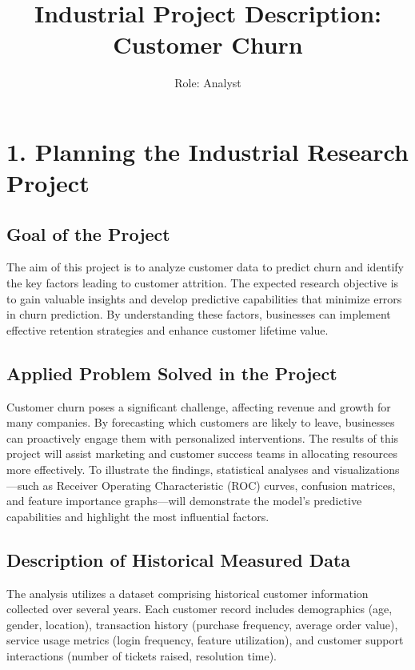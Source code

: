 \documentclass[12pt]{article}
\begin{document}
\title{Industrial Project Description: Customer Churn}
\author{Role: Analyst}
\date{}
\maketitle

\section*{1. Planning the Industrial Research Project}

\subsection*{Goal of the Project}

The aim of this project is to analyze customer data to predict churn and identify the key factors leading to customer attrition. The expected research objective is to gain valuable insights and develop predictive capabilities that minimize errors in churn prediction. By understanding these factors, businesses can implement effective retention strategies and enhance customer lifetime value.

\subsection*{Applied Problem Solved in the Project}

Customer churn poses a significant challenge, affecting revenue and growth for many companies. By forecasting which customers are likely to leave, businesses can proactively engage them with personalized interventions. The results of this project will assist marketing and customer success teams in allocating resources more effectively. To illustrate the findings, statistical analyses and visualizations---such as Receiver Operating Characteristic (ROC) curves, confusion matrices, and feature importance graphs---will demonstrate the model's predictive capabilities and highlight the most influential factors.

\subsection*{Description of Historical Measured Data}

The analysis utilizes a dataset comprising historical customer information collected over several years. Each customer record includes demographics (age, gender, location), transaction history (purchase frequency, average order value), service usage metrics (login frequency, feature utilization), and customer support interactions (number of tickets raised, resolution time).
\end{document}
